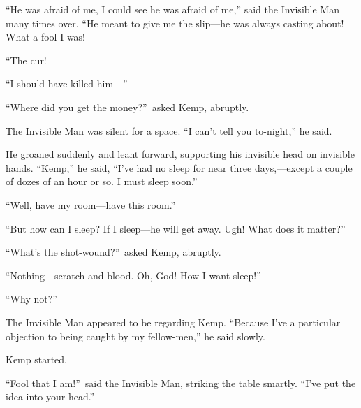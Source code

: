 “He was afraid of me, I could see he was afraid of me,” said the Invisible Man many times over. “He meant to give me the slip—he was always casting about! What a fool I was!

“The cur!

“I should have killed him—”

“Where did you get the money?”\ asked Kemp, abruptly.

The Invisible Man was silent for a space. “I can’t tell you to-night,” he said.

He groaned suddenly and leant forward, supporting his invisible head on invisible hands. “Kemp,” he said, “I’ve had no sleep for near three days,—except a couple of dozes of an hour or so. I must sleep soon.”

“Well, have my room—have this room.”

“But how can I sleep? If I sleep—he will get away. Ugh! What does it matter?”

“What’s the shot-wound?”\ asked Kemp, abruptly.

“Nothing—scratch and blood. Oh, God! How I want sleep!”

“Why not?”

The Invisible Man appeared to be regarding Kemp. “Because I’ve a particular objection to being caught by my fellow-men,” he said slowly.

Kemp started.

“Fool that I am!”\ said the Invisible Man, striking the table smartly. “I’ve put the idea into your head.”